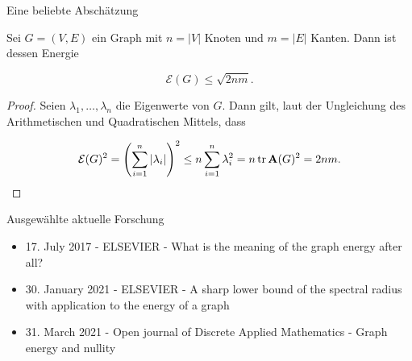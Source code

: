 \documentclass[aspectratio = 169]{beamer}
\begin{document}

\begin{frame}{Eine beliebte Abschätzung}

    \begin{theorem}

        Sei $G = (V, E)$ ein Graph mit $n = |V|$ Knoten und $m = |E|$ Kanten.
        Dann ist dessen Energie

        \[
            \mathcal E(G)
            \leq
            \sqrt{2 n m}.
        \]

    \end{theorem}

    \begin{proof}

        Seien $\lambda_1, \dots, \lambda_n$ die Eigenwerte von $G$.
        Dann gilt, laut der Ungleichung des Arithmetischen und Quadratischen Mittels, dass

        \[
            \mathcal E(G)^2
            =
            {\left ( 
                \sum_{i=1}^n
                    |\lambda_i|
             \right )}^2
            \leq
            n \sum_{i=1}^n \lambda_i^2
            =
            n \operatorname{tr} \mathbf A(G)^2
            =
            2 n m.
        \]

    \end{proof}

\end{frame}


\begin{frame}{Ausgewählte aktuelle Forschung}

    \begin{block}

        \begin{itemize}
            \item 17. July 2017 - ELSEVIER - What is the meaning of the graph energy after all?
            \item 30. January 2021 - ELSEVIER - A sharp lower bound of the spectral radius with application to the energy of a graph
            \item 31. March 2021 - Open journal of Discrete Applied Mathematics - Graph energy and nullity
        \end{itemize}
        
    \end{block}

\end{frame}

\end{document}
